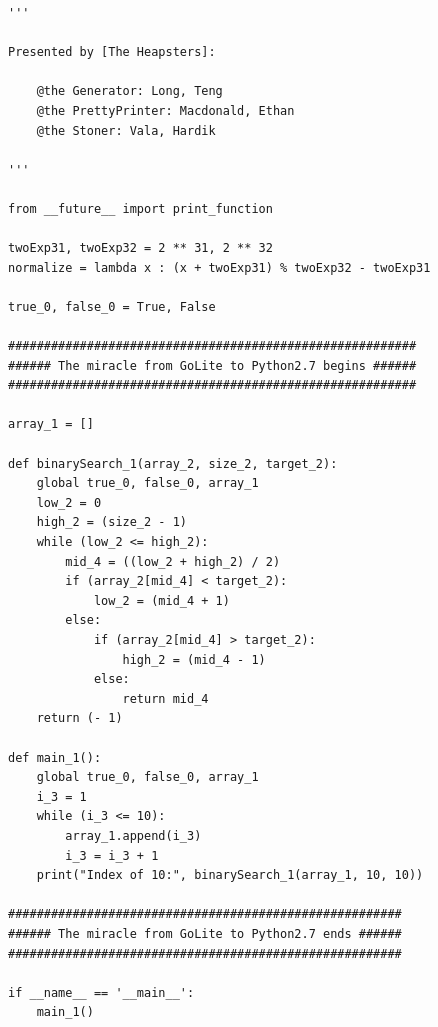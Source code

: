 \documentclass{article}
\begin{document}
\begin{lstlisting}
'''

Presented by [The Heapsters]:

	@the Generator: Long, Teng
	@the PrettyPrinter: Macdonald, Ethan
	@the Stoner: Vala, Hardik

'''

from __future__ import print_function

twoExp31, twoExp32 = 2 ** 31, 2 ** 32
normalize = lambda x : (x + twoExp31) % twoExp32 - twoExp31

true_0, false_0 = True, False

#########################################################
###### The miracle from GoLite to Python2.7 begins ######
#########################################################

array_1 = []

def binarySearch_1(array_2, size_2, target_2):
	global true_0, false_0, array_1
	low_2 = 0
	high_2 = (size_2 - 1)
	while (low_2 <= high_2):
		mid_4 = ((low_2 + high_2) / 2)
		if (array_2[mid_4] < target_2):
			low_2 = (mid_4 + 1)
		else:
			if (array_2[mid_4] > target_2):
				high_2 = (mid_4 - 1)
			else:
				return mid_4
	return (- 1)

def main_1():
	global true_0, false_0, array_1
	i_3 = 1
	while (i_3 <= 10):
		array_1.append(i_3)
		i_3 = i_3 + 1
	print("Index of 10:", binarySearch_1(array_1, 10, 10))

#######################################################
###### The miracle from GoLite to Python2.7 ends ######
#######################################################

if __name__ == '__main__':
	main_1()
\end{lstlisting}
\end{document}
